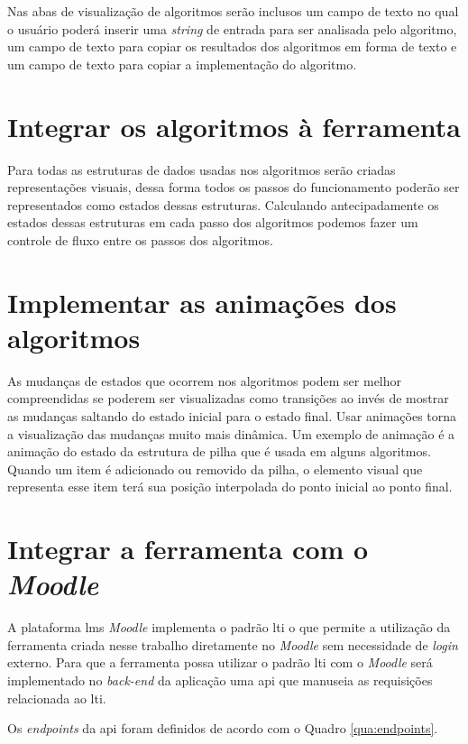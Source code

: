 Nas abas de visualização de algoritmos serão inclusos um campo de texto no qual o usuário poderá inserir uma \textit{string} de entrada para ser analisada pelo algoritmo, um campo de texto para copiar os resultados dos algoritmos em forma de texto e um campo de texto para copiar a implementação do algoritmo.

\section{Integrar os algoritmos à ferramenta}
Para todas as estruturas de dados usadas nos algoritmos serão criadas representações visuais, dessa forma todos os passos do funcionamento poderão ser representados como estados dessas estruturas. Calculando antecipadamente os estados dessas estruturas em cada passo dos algoritmos podemos fazer um controle de fluxo entre os passos dos algoritmos.

\section{Implementar as animações dos algoritmos}
As mudanças de estados que ocorrem nos algoritmos podem ser melhor compreendidas se poderem ser visualizadas como transições ao invés de mostrar as mudanças saltando do estado inicial para o estado final. Usar animações torna a visualização das mudanças muito mais dinâmica. Um exemplo de animação é a animação do estado da estrutura de pilha que é usada em alguns algoritmos. Quando um item é adicionado ou removido da pilha, o elemento visual que representa esse item terá sua posição interpolada do ponto inicial ao ponto final.

\section{Integrar a ferramenta com o \textit{Moodle}}
A plataforma \gls{lms} \textit{Moodle} implementa o padrão \gls{lti} o que permite a utilização da ferramenta criada nesse trabalho diretamente no \textit{Moodle} sem necessidade de \textit{login} externo. Para que a ferramenta possa utilizar o padrão \gls{lti} com o \textit{Moodle} será implementado no \textit{back-end} da aplicação uma \gls{api} que manuseia as requisições relacionada ao \gls{lti}. 

Os \textit{endpoints} da \gls{api} foram definidos de acordo com o Quadro \ref{qua:endpoints}.

